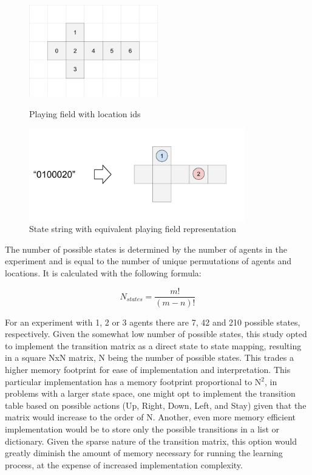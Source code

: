 \documentclass[10pt]{article}
\begin{document}
    \begin{figure}[h]
        \centering
        \begin{minipage}[b]{0.3\textwidth}
            \includegraphics[height=4cm]{./Images/2_Playing_Field_Indexed.jpg}
            \caption{Playing field with location ids}
            \label{fig:field_indexed}
        \end{minipage}
        \hfill
        \begin{minipage}[b]{0.5\textwidth}
            \includegraphics[height=4cm]{./Images/3_Playing_Field_Encoding.jpg}
            \caption{State string with equivalent playing field representation}
            \label{fig:field_mapping}
        \end{minipage}
    \end{figure}


    The number of possible states is determined by the number of agents in the experiment and is equal to the number of unique permutations of agents and locations. It is calculated with the following formula:

    \begin{equation}
        N_{states} = \dfrac{m!}{(m-n)!}
    \end{equation}

    For an experiment with 1, 2 or 3 agents there are 7, 42 and 210 possible states, respectively. Given the somewhat low number of possible states, this study opted to implement the transition matrix as a direct state to state mapping, resulting in a square NxN matrix, N being the number of possible states. This trades a higher memory footprint for ease of implementation and interpretation. This particular implementation has a memory footprint proportional to N$^2$, in problems with a larger state space, one might opt to implement the transition table based on possible actions (Up, Right, Down, Left, and Stay) given that the matrix would increase to the order of N. Another, even more memory efficient implementation would be to store only the possible transitions in a list or dictionary. Given the sparse nature of the transition matrix, this option would greatly diminish the amount of memory necessary for running the learning process, at the expense of increased implementation complexity.
\end{document}
